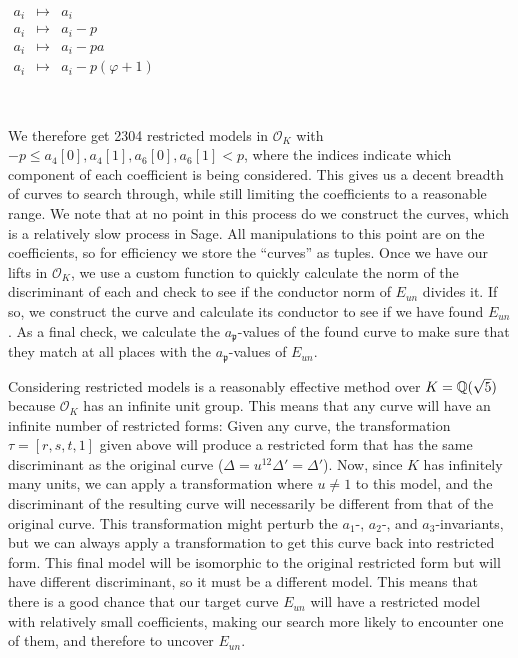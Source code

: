\


$\begin{array}{rcl}
a_i & \mapsto & a_i \\
a_i & \mapsto & a_i - p \\
a_i & \mapsto & a_i - pa \\
a_i & \mapsto & a_i -p(\varphi+1)
\end{array}$

\

We therefore get 2304 restricted models in $\mathcal{O}_K$ with $-p \leq a_4[0], a_4[1],a_6[0],a_6[1] < p$, where the indices indicate which component of each coefficient is being considered. This gives us a decent breadth of curves to search through, while still limiting the coefficients to a reasonable range. We note that at no point in this process do we construct the curves, which is a relatively slow process in Sage. All manipulations to this point are on the coefficients, so for efficiency we store the ``curves'' as tuples. Once we have our lifts in $\mathcal{O}_K$, we use a custom function to quickly calculate the norm of the discriminant of each and check to see if the conductor norm of $E_{un}$ divides it. If so, we construct the curve and calculate its conductor to see if we have found $E_{un}$. As a final check, we calculate the $a_\mathfrak{p}$-values of the found curve to make sure that they match at all places with the $a_\mathfrak{p}$-values of $E_{un}$.

Considering restricted models is a reasonably effective method over $K = \mathbb{Q}(\sqrt{5})$ because $\mathcal{O}_K$ has an infinite unit group. This means that any curve will have an infinite number of restricted forms: Given any curve, the transformation $\tau=[r,s,t,1]$ given above will produce a restricted form that has the same discriminant as the original curve ($\Delta = u^{12}\Delta ' = \Delta '$). Now, since $K$ has infinitely many units, we can apply a transformation where $u \neq 1$ to this model, and the discriminant of the resulting curve will necessarily be different from that of the original curve. This transformation might perturb the $a_1$-, $a_2$-, and $a_3$-invariants, but we can always apply a transformation to get this curve back into restricted form. This final model will be isomorphic to the original restricted form but will have different discriminant, so it must be a different model. This means that there is a good chance that our target curve $E_{un}$ will have a restricted model with relatively small coefficients, making our search more likely to encounter one of them, and therefore to uncover $E_{un}$.


